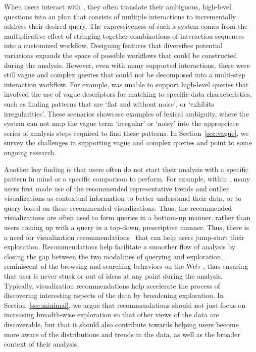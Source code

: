 When users interact with \zv, 
they often translate their ambiguous, 
high-level questions 
into an plan that consists of multiple interactions 
to incrementally address their desired query. 
The expressiveness of such a system 
comes from the multiplicative effect 
of stringing together combinations of 
interaction sequences into a customized workflow. 
Designing features that diversifies potential 
variations expands the space of possible workflows 
that could be constructed during the analysis. 
However, even with many supported interactions, 
there were still vague and complex queries 
that could not be decomposed 
into a multi-step interaction workflow. 
For example, \zv was unable to support 
high-level queries that involved the use of vague 
descriptors for matching to specific data 
characteristics, such as finding patterns that 
are `flat and without noise', or `exhibits irregularities'. 
These scenarios showcase examples of lexical ambiguity, 
where the system can not map the vague term `irregular' or `noisy' 
into the appropriate series of analysis steps 
required to find these patterns. 
In Section~\ref{sec:vague}, we survey the challenges 
in supporting vague and complex queries 
and point to some ongoing research.

Another key finding is that 
users often do not start their analysis 
with a specific pattern in mind or a specific comparison to perform. 
For example, within \zv, many users 
first made use of the recommended 
representative trends and outlier visualizations 
as contextual information 
to better understand their data, 
or to query based on these recommended visualizations.
Thus, the recommended visualizations
are often used to form queries in a bottom-up
manner, rather than users coming up with a query
in a top-down, prescriptive manner.
Thus, there is a need for visualization recommendations~\cite{Vartak2017}
that can help users jump-start their exploration.
Recommendations help facilitate a smoother flow
of analysis by closing the gap between the two modalities
of querying and exploration, 
reminiscent of the browsing and searching 
behaviors on the Web~\cite{Olston2003}, thus 
ensuring that user is never stuck or out of 
ideas at any point during the analysis. 
Typically, visualization recommendations help 
accelerate the process of discovering 
interesting aspects of the data by broadening exploration. 
In Section~\ref{sec:minimal}, we argue 
that recommendations should not just focus on 
increasing breadth-wise exploration
so that other views of the data are discoverable,
but that it should also contribute
towards helping users become more aware of the 
distributions and trends in the data,
as well as the broader context of their analysis.

